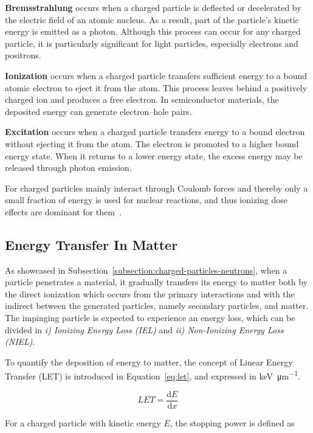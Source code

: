 \textbf{Bremsstrahlung} occurs when a charged particle is deflected or decelerated by the electric field of an atomic nucleus. As a result, part of the particle's kinetic energy is emitted as a photon. Although this process can occur for any charged particle, it is particularly significant for light particles, especially electrons and positrons.

\textbf{Ionization} occurs when a charged particle transfers sufficient energy to a bound atomic electron to eject it from the atom. This process leaves behind a positively charged ion and produces a free electron. In semiconductor materials, the deposited energy can generate electron--hole pairs.

\textbf{Excitation} occurs when a charged particle transfers energy to a bound electron without ejecting it from the atom. The electron is promoted to a higher bound energy state. When it returns to a lower energy state, the excess energy may be released through photon emission.

For charged particles mainly interact through Coulomb forces and thereby only a small fraction of energy is used for nuclear reactions, and thus ionizing dose effects are dominant for them~\cite{barbottin1999instabilities}.

\subsection{Energy Transfer In Matter}
\label{subsection:energy-transfer}

As showcased in Subsection~\ref{subsection:charged-particles-neutrons}, when a particle penetrates a material, it gradually transfers its energy to matter both by the direct ionization which occurs from the primary interactions and with the indirect between the generated particles, namely secondary particles, and matter. The impinging particle is expected to experience an energy loss, which can be divided in \textit{i) Ionizing Energy Loss (IEL)} and \textit{ii) Non-Ionizing Energy Loss (NIEL)}.

To quantify the deposition of energy to matter, the concept of Linear Energy Transfer (LET) is introduced in Equation~\ref{eq:let}, and expressed in \si{\kilo\electronvolt\per\micro\metre}.

\begin{equation}
    LET = \frac{\mathrm{d}E}{\mathrm{d}x}
    \label{eq:let}
\end{equation}

For a charged particle with kinetic energy $E$, the stopping power is defined as~\cite{knoll_2010_ch2}

